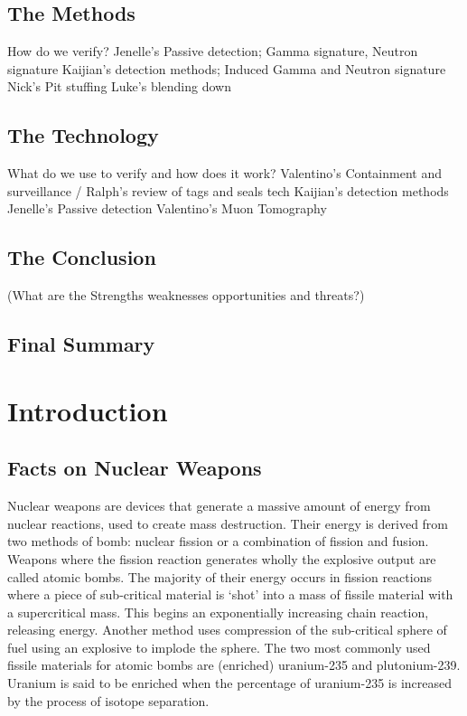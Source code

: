 \documentclass[twoside,titlepage,11pt,twocolumn,a4paper]{article}
\begin{document}
\subsection*{The Methods}
How do we verify?
Jenelle's Passive detection; Gamma signature, Neutron signature
Kaijian's detection methods; Induced Gamma and Neutron signature 
Nick's Pit stuffing
Luke's blending down
\subsection*{The Technology}
What do we use to verify and how does it work?
Valentino's Containment and surveillance / Ralph's review of tags and seals tech
Kaijian's detection methods
Jenelle's Passive detection
Valentino's Muon Tomography 

\subsection*{The Conclusion}
(What are the Strengths weaknesses opportunities and threats?)
\subsection*{Final Summary}

\newpage
\tableofcontents
\twocolumn

\section{Introduction}

\subsection{Facts on Nuclear Weapons}
Nuclear weapons are devices that generate a massive amount of energy
from nuclear reactions, used to create mass destruction. Their energy
is derived from two methods of bomb: nuclear fission or a combination
of fission and fusion. Weapons where the fission reaction generates
wholly the explosive output are called atomic bombs. The majority of
their energy occurs in fission reactions where a piece of sub-critical
material is `shot' into a mass of fissile material with a
supercritical mass. This begins an exponentially increasing chain
reaction, releasing energy. Another method uses compression of the
sub-critical sphere of fuel using an explosive to implode the
sphere. The two most commonly used fissile materials for atomic bombs
are (enriched) uranium-235 and plutonium-239. Uranium is said to be
enriched when the percentage of uranium-235 is increased by the
process of isotope separation.
\end{document}
